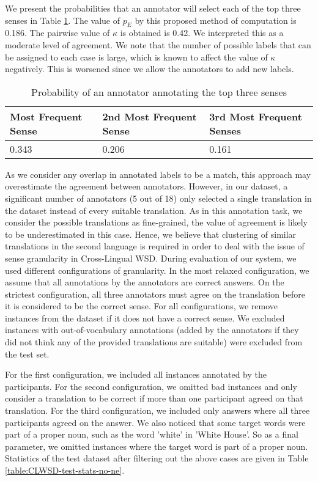 \documentclass[11pt]{article}
\begin{document}
We present the probabilities that an annotator will select each of the top three senses in Table \ref{table:IAA}. The value of $p_E$ by this proposed method of computation is 0.186. The pairwise value of $\kappa$ is obtained is 0.42. We interpreted this as a moderate level of agreement. We note that the number of possible labels that can be assigned to each case is large, which is known to affect the value of $\kappa$ negatively. This is worsened since we allow the annotators to add new labels. 

\begin{table}[ht]
	\caption{Probability of an annotator annotating the top three senses}
	\label{table:IAA}
	\begin{center}
		\begin{tabular}{| p{4cm} | p{4cm}  | p{4cm} | }
			\hline
			Most Frequent Sense & 2nd Most Frequent Sense & 3rd Most Frequent Senses\\
			\hline
			0.343 & 0.206 & 0.161\\						
			
			\hline
		\end{tabular}
	\end{center}
\end{table}

As we consider any overlap in annotated labels to be a match, this approach may overestimate the agreement between annotators. However, in our dataset, a significant number of annotators (5 out of 18) only selected a single translation in the dataset instead of every suitable translation. As in this annotation task, we consider the possible translations as  fine-grained, the value of agreement is likely to be underestimated in this case. Hence, we believe that clustering of similar translations in the second language is required in order to deal with the issue of sense granularity in Cross-Lingual WSD. During evaluation of our system, we used different configurations of granularity. In the most relaxed configuration, we assume that all annotations by the annotators are correct answers. On the strictest configuration, all three annotators must agree on the translation before it is considered to be the correct sense. For all configurations, we remove instances from the dataset if it does not have a correct sense. We excluded instances with out-of-vocabulary annotations (added by the annotators if they did not think any of the provided translations are suitable) were excluded from the test set.


For the first configuration, we included all instances annotated by the participants. For the second configuration, we omitted bad instances and only consider a translation to be correct if more than one participant agreed on that translation. For the third configuration, we included only answers where all three participants agreed on the answer. We also noticed that some target words were part of a proper noun, such as the word 'white' in 'White House'. So as a final parameter, we omitted instances where the target word is part of a proper noun. Statistics of the test dataset after filtering out the above cases are given in Table \ref{table:CLWSD-test-stats-no-ne}.
\end{document}
